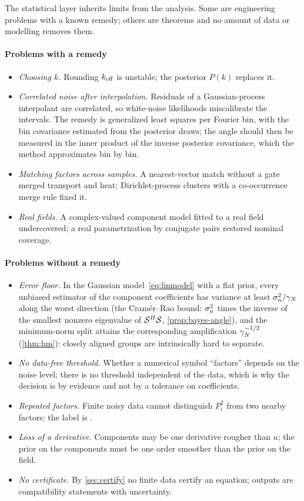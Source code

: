 The statistical layer inherits limits from the analysis. Some are engineering problems with a known
remedy; others are theorems and no amount of data or modelling removes them.

\paragraph{Problems with a remedy}
\begin{itemize}
  \item \emph{Choosing $k$.} Rounding $k_{\mathrm{eff}}$ is unstable; the posterior $P(k)$ replaces it.
  \item \emph{Correlated noise after interpolation.} Residuals of a Gaussian-process interpolant are
  correlated, so white-noise likelihoods miscalibrate the intervals. The remedy is generalized least squares
  per Fourier bin, with the bin covariance estimated from the posterior draws; the angle should then be
  measured in the inner product of the inverse posterior covariance, which the method approximates bin by bin.
  \item \emph{Matching factors across samples.} A nearest-vector match without a gate merged transport and
  heat; Dirichlet-process clusters with a co-occurrence merge rule fixed it.
  \item \emph{Real fields.} A complex-valued component model fitted to a real field undercovered; a real
  parametrization by conjugate pairs restored nominal coverage.
\end{itemize}

\paragraph{Problems without a remedy}
\begin{itemize}
  \item \emph{Error floor.} In the Gaussian model~\eqref{eq:linmodel} with a flat prior, every unbiased estimator of the
  component coefficients has variance at least $\sigma_{n}^2/\gamma_{N}$ along the worst direction (the Cram\'er--Rao bound: $\sigma_{n}^2$ times the
  inverse of the smallest nonzero eigenvalue of $\mathcal{S}^H\mathcal{S}$, \cref{prop:bayes-angle}), and the minimum-norm split attains
  the corresponding amplification $\gamma_{N}^{-1/2}$ (\cref{thm:hm}):
  closely aligned groups are intrinsically hard to separate.
  \item \emph{No data-free threshold.} Whether a numerical symbol ``factors'' depends on the noise level;
  there is no threshold independent of the data, which is why the decision is by evidence and not by a
  tolerance on coefficients.
  \item \emph{Repeated factors.} Finite noisy data cannot distinguish $P_i^2$ from two nearby factors;
  the label is \UND.
  \item \emph{Loss of a derivative.} Components may be one derivative rougher than $u$; the prior on the
  components must be one order smoother than the prior on the field.
  \item \emph{No certificate.} By \cref{sec:certify} no finite data certify an equation; outputs are
  compatibility statements with uncertainty.
\end{itemize}
